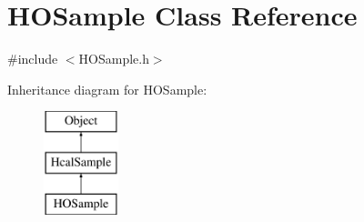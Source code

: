 \hypertarget{class_h_o_sample}{}\section{H\+O\+Sample Class Reference}
\label{class_h_o_sample}


{\ttfamily \#include $<$H\+O\+Sample.\+h$>$}

Inheritance diagram for H\+O\+Sample\+:\begin{figure}[H]
\begin{center}
\leavevmode
\includegraphics[height=3.000000cm]{class_h_o_sample}
\end{center}
\end{figure}

